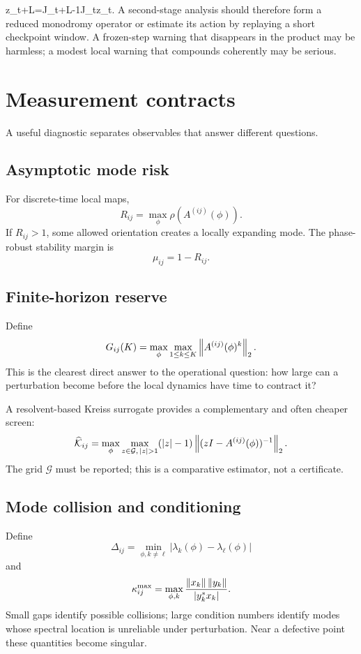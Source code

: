 \delta z_{t+L}=J_{t+L-1}\cdots J_t\delta z_t.
\]
A second-stage analysis should therefore form a reduced monodromy operator or estimate its action by replaying a short checkpoint window.  A frozen-step warning that disappears in the product may be harmless; a modest local warning that compounds coherently may be serious.

\section{Measurement contracts}

A useful diagnostic separates observables that answer different questions.

\subsection{Asymptotic mode risk}

For discrete-time local maps,
\[
R_{ij}=\max_{\phi}\rho(A^{(ij)}(\phi)).
\]
If \(R_{ij}>1\), some allowed orientation creates a locally expanding mode.  The phase-robust stability margin is
\[
\mu_{ij}=1-R_{ij}.
\]

\subsection{Finite-horizon reserve}

Define
\begin{equation}
G_{ij}(K)=
\max_{\phi}
\max_{1\leq k\leq K}
\left\lVert A^{(ij)}(\phi)^k\right\rVert_2.
\label{eq:finite-gain}
\end{equation}
This is the clearest direct answer to the operational question: how large can a perturbation become before the local dynamics have time to contract it?

A resolvent-based Kreiss surrogate provides a complementary and often cheaper screen:
\[
\widehat{\mathcal K}_{ij}
=
\max_{\phi}
\max_{z\in\mathcal G,\,|z|>1}
(|z|-1)\norm{(zI-A^{(ij)}(\phi))^{-1}}_2.
\]
The grid \(\mathcal G\) must be reported; this is a comparative estimator, not a certificate.

\subsection{Mode collision and conditioning}

Define
\[
\Delta_{ij}
=
\min_{\phi,k\neq\ell}
|\lambda_k(\phi)-\lambda_\ell(\phi)|
\]
and
\[
\kappa_{ij}^{\max}
=
\max_{\phi,k}
\frac{\left\lVert x_k\right\rVert\left\lVert y_k\right\rVert}{|y_k^*x_k|}.
\]
Small gaps identify possible collisions; large condition numbers identify modes whose spectral location is unreliable under perturbation.  Near a defective point these quantities become singular.

